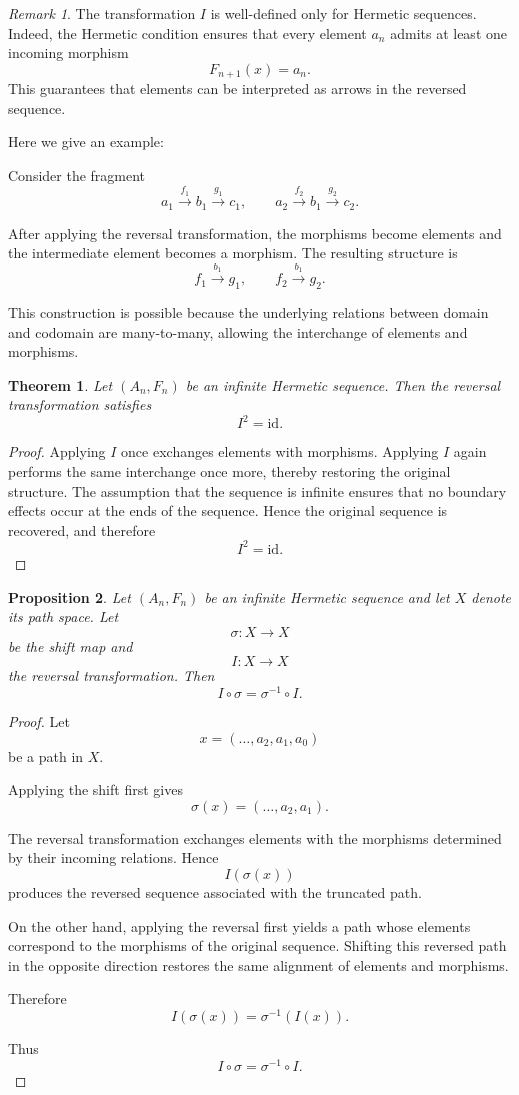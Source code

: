 \documentclass[11pt]{book}
\theoremstyle{definition}
\theoremstyle{plain}
\newtheorem{theorem}{Theorem}[section]
\newtheorem{proposition}[theorem]{Proposition}
\theoremstyle{remark}
\newtheorem*{remark}{Remark}
\begin{document}
\begin{remark}
The transformation $I$ is well-defined only for
Hermetic sequences. Indeed, the Hermetic condition
ensures that every element $a_n$ admits at least one
incoming morphism
\[
F_{n+1}(x)=a_n.
\]
This guarantees that elements can be interpreted as
arrows in the reversed sequence.
\end{remark}


Here we give an example: 

Consider the fragment
\[
a_1 \xrightarrow{f_1} b_1 \xrightarrow{g_1} c_1,
\qquad
a_2 \xrightarrow{f_2} b_1 \xrightarrow{g_2} c_2 .
\]

After applying the reversal transformation, the
morphisms become elements and the intermediate
element becomes a morphism. The resulting structure
is
\[
f_1 \xrightarrow{b_1} g_1,
\qquad
f_2 \xrightarrow{b_1} g_2 .
\]

This construction is possible because the underlying
relations between domain and codomain are many-to-many,
allowing the interchange of elements and morphisms.



\begin{theorem}
Let $(A_n,F_n)$ be an infinite Hermetic sequence.
Then the reversal transformation satisfies
\[
I^2 = \mathrm{id}.
\]
\end{theorem}

\begin{proof}
Applying $I$ once exchanges elements with morphisms.
Applying $I$ again performs the same interchange
once more, thereby restoring the original structure.
The assumption that the sequence is infinite ensures
that no boundary effects occur at the ends of the
sequence. Hence the original sequence is recovered,
and therefore
\[
I^2=\mathrm{id}.
\]
\end{proof}

\begin{proposition}
Let $(A_n,F_n)$ be an infinite Hermetic sequence and
let $X$ denote its path space. Let
\[
\sigma : X \to X
\]
be the shift map and
\[
I : X \to X
\]
the reversal transformation. Then
\[
I\circ\sigma = \sigma^{-1}\circ I .
\]
\end{proposition}

\begin{proof}
Let
\[
x=(\ldots,a_2,a_1,a_0)
\]
be a path in $X$.

Applying the shift first gives
\[
\sigma(x)=(\ldots,a_2,a_1).
\]

The reversal transformation exchanges elements with the
morphisms determined by their incoming relations.
Hence
\[
I(\sigma(x))
\]
produces the reversed sequence associated with the
truncated path.

On the other hand, applying the reversal first yields
a path whose elements correspond to the morphisms of
the original sequence. Shifting this reversed path
in the opposite direction restores the same alignment
of elements and morphisms.

Therefore
\[
I(\sigma(x))=\sigma^{-1}(I(x)).
\]

Thus
\[
I\circ\sigma = \sigma^{-1}\circ I .
\]
\end{proof}
\end{document}
